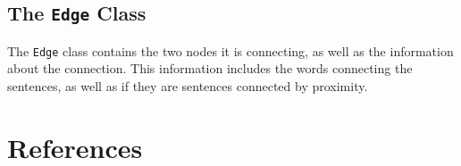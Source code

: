 \documentclass[xcolor={usenames,dvipsnames,svgnames},handouts]{beamer}
\begin{document}
\subsection{The {\tt Edge} Class}
\begin{frame}
The {\tt Edge} class contains the two nodes it is connecting, as well as the information about the connection.
\vskip 1pc
This information includes the words connecting the sentences, as well as if they are sentences connected by proximity.
\end{frame}

\section{References}
\begin{frame}[allowframebreaks]
\nocite{*}
\printbibliography
\end{frame}
\end{document}
